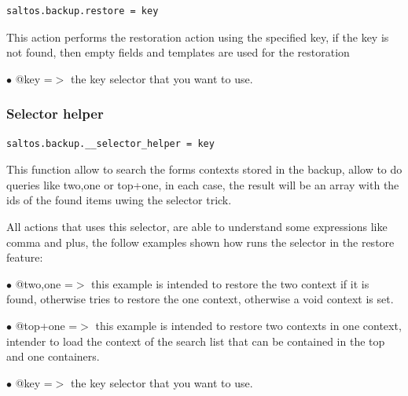 \documentclass[a4paper]{article}
\begin{document}
\begin{lstlisting}
saltos.backup.restore = key
\end{lstlisting}

This action performs the restoration action using the specified key, if the
key is not found, then empty fields and templates are used for the restoration

\begin{compactitem}
\item[\color{myblue}$\bullet$] @key =$>$ the key selector that you want to use.
\end{compactitem}

\hypertarget{toc34}{}
\subsubsection{Selector helper}

\begin{lstlisting}
saltos.backup.__selector_helper = key
\end{lstlisting}

This function allow to search the forms contexts stored in the backup, allow to
do queries like two,one or top+one, in each case, the result will be an array
with the ids of the found items uwing the selector trick.

All actions that uses this selector, are able to understand some expressions like comma
and plus, the follow examples shown how runs the selector in the restore feature:

\begin{compactitem}
\item[\color{myblue}$\bullet$] @two,one =$>$ this example is intended to restore the two context if it is found, otherwise
tries to restore the one context, otherwise a void context is set.
\end{compactitem}

\begin{compactitem}
\item[\color{myblue}$\bullet$] @top+one =$>$ this example is intended to restore two contexts in one context, intender to
load the context of the search list that can be contained in the top and one containers.
\end{compactitem}

\begin{compactitem}
\item[\color{myblue}$\bullet$] @key =$>$ the key selector that you want to use.
\end{compactitem}
\end{document}
